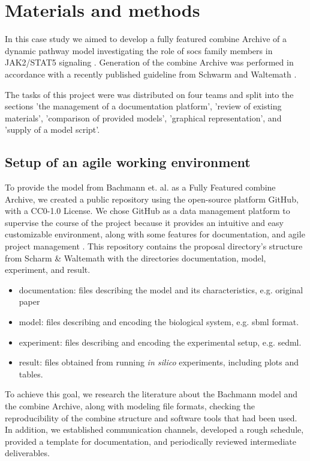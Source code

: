 \section*{Materials and methods} \label{sec:matmet}

In this case study we aimed to develop a fully featured \ac{combine} Archive of a dynamic pathway model investigating the role of \ac{socs} family members in JAK2/STAT5 signaling \cite{bachmannmodel}. Generation of the \ac{combine} Archive was performed in accordance with a recently published guideline from Schwarm and Waltemath \cite{combine}.

The tasks of this project were was distributed on  four teams and split into the sections 'the management of a documentation platform', 'review of existing materials', 'comparison of provided models', 'graphical representation', and 'supply of a model script'.

\subsection*{Setup of an agile working environment} \label{setupagwork}
To provide the model from Bachmann et. al. \cite{bachmannmodel} as a Fully Featured \ac{combine} Archive, we created a public repository using the open-source platform GitHub, with a CC0-1.0 License. We chose GitHub as a data management platform to supervise the course of the project because it provides an intuitive and easy customizable environment, along with some features for documentation, and agile project management \cite{github}. This repository contains the proposal directory's structure from Scharm \& Waltemath \cite{combine} with the directories documentation, model, experiment, and result.
\begin{itemize}
    \item documentation: files describing the model and its characteristics, e.g. original paper
    \item model: files describing and encoding the biological system, e.g. \ac{sbml} format.
    \item experiment: files describing and encoding the experimental setup, e.g. \ac{sedml}.
    \item result: files obtained from running \textit{in silico} experiments, including plots and tables.
\end{itemize}

To achieve this goal, we research the literature about the Bachmann model and the \ac{combine} Archive, along with modeling file formats, checking the reproducibility of the \ac{combine} structure and software tools that had been used. In addition, we established communication channels, developed a rough schedule, provided a template for documentation, and periodically reviewed intermediate deliverables.

